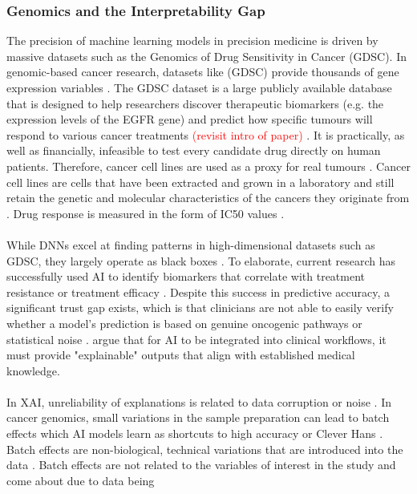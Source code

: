 \subsubsection{Genomics and the Interpretability Gap}
The precision of machine learning models in precision medicine is driven by massive datasets 
such as the Genomics of Drug Sensitivity in Cancer (GDSC). In genomic-based cancer research, 
datasets like (GDSC) provide thousands of gene expression variables \cite{Baptista2021,Yang2013}. 
The GDSC dataset is a large publicly available database that is designed to help researchers 
discover therapeutic biomarkers (e.g. the expression levels of the EGFR gene) and predict 
how specific tumours will respond to various cancer treatments \textcolor{red}{(revisit intro of paper)}
\cite{Yang2013}. It is practically, as well as financially, infeasible to test every 
candidate drug directly on human patients. Therefore, cancer cell lines are used as a proxy 
for real tumours \cite{Yang2013}. Cancer cell lines are cells that have been extracted 
and grown in a laboratory and still retain the genetic and molecular characteristics of the 
cancers they originate from \cite{Yang2013}. Drug response is measured in the form of IC50 
values \cite{Yang2013}.
\\\\
While DNNs excel at finding patterns in high-dimensional datasets such as GDSC, they largely 
operate as black boxes \cite{Partin2023,Klauschen2024}. To elaborate, current research 
has successfully used AI to identify biomarkers that correlate with treatment resistance or treatment 
efficacy \cite{Partin2023,Klauschen2024,Baptista2021}. Despite this success in 
predictive accuracy, a significant trust gap exists, which is that clinicians are not able to easily 
verify whether a model’s prediction is based on genuine oncogenic pathways or statistical noise 
\cite{Klauschen2024}. \cite{Klauschen2024} argue that for AI to be integrated into clinical 
workflows, it must provide "explainable" outputs that align with established medical knowledge.
\\\\
In XAI, unreliability of explanations is related to data corruption or noise \cite{Klauschen2024}. 
In cancer genomics, small variations in the sample preparation can lead to batch effects which AI models 
learn as shortcuts to high accuracy or Clever Hans \cite{Partin2023,Klauschen2024}. Batch 
effects are non-biological, technical variations that are introduced into the data \cite{Yu2024, Goh2022}. 
Batch effects are not related to the variables of interest in the study and come about due to data being 
